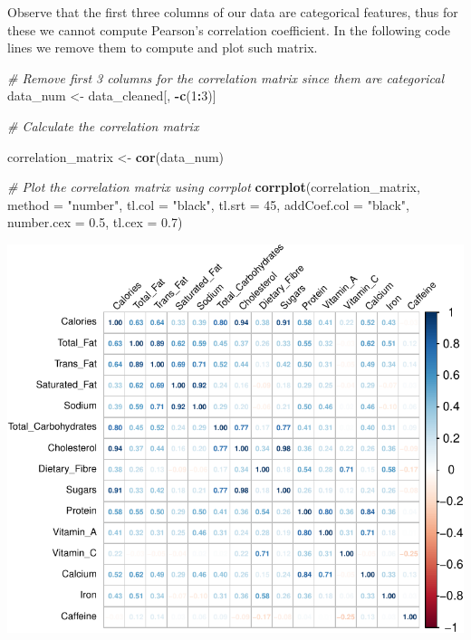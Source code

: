 \documentclass[
]{article}
\newenvironment{Shaded}{\begin{snugshade}}{\end{snugshade}}
\newcommand{\AttributeTok}[1]{\textcolor[rgb]{0.13,0.29,0.53}{#1}}
\newcommand{\CommentTok}[1]{\textcolor[rgb]{0.56,0.35,0.01}{\textit{#1}}}
\newcommand{\DecValTok}[1]{\textcolor[rgb]{0.00,0.00,0.81}{#1}}
\newcommand{\FloatTok}[1]{\textcolor[rgb]{0.00,0.00,0.81}{#1}}
\newcommand{\FunctionTok}[1]{\textcolor[rgb]{0.13,0.29,0.53}{\textbf{#1}}}
\newcommand{\NormalTok}[1]{#1}
\newcommand{\OtherTok}[1]{\textcolor[rgb]{0.56,0.35,0.01}{#1}}
\newcommand{\SpecialCharTok}[1]{\textcolor[rgb]{0.81,0.36,0.00}{\textbf{#1}}}
\newcommand{\StringTok}[1]{\textcolor[rgb]{0.31,0.60,0.02}{#1}}
\begin{document}
Observe that the first three columns of our data are categorical
features, thus for these we cannot compute Pearson's correlation
coefficient. In the following code lines we remove them to compute and
plot such matrix.

\begin{Shaded}
\begin{Highlighting}[]
\CommentTok{\# Remove first 3 columns for the correlation matrix since them are categorical}
\NormalTok{data\_num }\OtherTok{\textless{}{-}}\NormalTok{ data\_cleaned[, }\SpecialCharTok{{-}}\FunctionTok{c}\NormalTok{(}\DecValTok{1}\SpecialCharTok{:}\DecValTok{3}\NormalTok{)]}

\CommentTok{\# Calculate the correlation matrix}

\NormalTok{correlation\_matrix }\OtherTok{\textless{}{-}} \FunctionTok{cor}\NormalTok{(data\_num)}

\CommentTok{\# Plot the correlation matrix using corrplot}
\FunctionTok{corrplot}\NormalTok{(correlation\_matrix, }\AttributeTok{method =} \StringTok{"number"}\NormalTok{, }\AttributeTok{tl.col =} \StringTok{"black"}\NormalTok{, }
         \AttributeTok{tl.srt =} \DecValTok{45}\NormalTok{, }\AttributeTok{addCoef.col =} \StringTok{"black"}\NormalTok{, }\AttributeTok{number.cex =} \FloatTok{0.5}\NormalTok{, }\AttributeTok{tl.cex =} \FloatTok{0.7}\NormalTok{)}
\end{Highlighting}
\end{Shaded}

\begin{center}\includegraphics{Statistical_Learning_Final_Report_files/figure-latex/correlation_analysis-1} \end{center}
\end{document}
